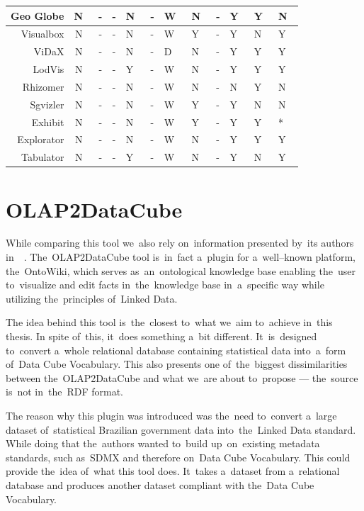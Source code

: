 \begin{tabularx}{\textwidth}{ |r|C|C|C|X|X|X|X|X|X|X|X| }
  Geo Globe             & N~& - & - & N~& - & W~& N~& - & Y~& Y~& N~\\ \hline
  Visualbox              & N~& - & - & N~& - & W~& Y~& - & Y~& N~& Y~\\ \hline
  ViDaX                    & N~& - & - & N~& - & D~& N~& - & Y~& Y~& Y~\\ \hline
  LodVis                   & N~& - & - & Y~& - & W~& N~& - & Y~& Y~& Y~\\ \hline
  Rhizomer              & N~& - & - & N~& - & W~& N~& - & N~& Y~& N~\\ \hline
  Sgvizler                 & N~& - & - & N~& - & W~& Y~& - & Y~& N~& N~\\ \hline
  Exhibit                  & N~& - & - & N~& - & W~& Y~& - & Y~& Y~& * \\ \hline
  Explorator             & N~& - & - & N~& - & W~& N~& - & Y~& Y~& Y~\\ \hline
  Tabulator              & N~& - & - & Y~& - & W~& N~& - & Y~& N~& Y~\\ \hline
\end{tabularx}

\section{OLAP2DataCube}
\label{olap2dc}
\label{rw:olap2dc}
While comparing this tool we~also rely on~information presented by~its authors in~~\cite{olap2dc-paper}. The~OLAP2DataCube tool is~in~fact a~plugin for a~well--known 
platform, the~OntoWiki, which serves as~an~ontological knowledge base enabling
the~user to~visualize and edit facts in~the~knowledge base in~a~specific way
while utilizing the~principles of~Linked Data.

The idea behind this tool is~the~closest to~what we~aim to~achieve in~this thesis.
In spite of~this, it~does something a~bit different. It~is~designed to~convert a~whole relational database containing statistical data into~a~form of~Data Cube 
Vocabulary. This also presents one of~the~biggest dissimilarities between the~OLAP2DataCube and 
what we~are about to~propose --- the~source is~not in~the~RDF format.

The reason why this plugin was introduced was the~need to~convert a~large 
dataset of~statistical Brazilian government data into~the~Linked Data standard.
While doing that the~authors wanted to~build up~on~existing metadata standards, 
such as~SDMX and therefore on~Data Cube Vocabulary. This could provide the~idea of~what this tool does. It~takes a~dataset from a~relational database and produces 
another dataset compliant with the~Data Cube Vocabulary.

